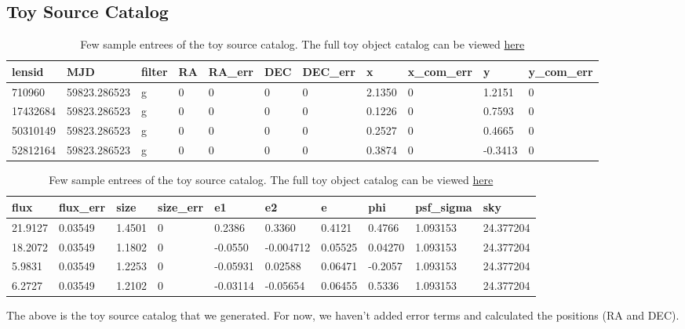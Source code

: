 \documentclass[\docopts]{\docclass}
\begin{document}
\subsection{Toy Source Catalog}
\label{subsec:toysource}

\begin{table}[!h]
\centering
\begin{tabular}{|l|l|l|l|l|l|l|l|l|l|l|}
\hline
lensid   & MJD          & filter & RA & RA\_err & DEC & DEC\_err & x              & x\_com\_err & y               & y\_com\_err \\ \hline 
710960   & 59823.286523 & g      & 0  & 0       & 0   & 0        & 2.1350  & 0           & 1.2151 & 0			\\
17432684 & 59823.286523 & g      & 0  & 0       & 0   & 0        & 0.1226 & 0           & 0.7593  & 0           \\
50310149 & 59823.286523 & g      & 0  & 0       & 0   & 0        & 0.2527 & 0           & 0.4665  & 0           \\
52812164 & 59823.286523 & g      & 0  & 0       & 0   & 0        & 0.3874 & 0           & -0.3413 & 0          \\ \hline
\end{tabular}
\begin{tabular}{|l|l|l|l|l|l|l|l|l|l|}
\hline
flux          & flux\_err       & size          & size\_err & e1               & e2                & e               & phi             & psf\_sigma & sky       \\ \hline
21.9127 & 0.03549 & 1.4501 & 0         & 0.2386    & 0.3360    & 0.4121  & 0.4766  & 1.093153   & 24.377204 \\
18.2072 & 0.03549& 1.1802  & 0         & -0.0550 & -0.004712  & 0.05525 & 0.04270 & 1.093153   & 24.377204 \\
5.9831 & 0.03549 & 1.2253 & 0         & -0.05931 & 0.02588     & 0.06471 & -0.2057 & 1.093153   & 24.377204 \\
6.2727 & 0.03549 & 1.2102  & 0         & -0.03114 & -0.05654  & 0.06455 & 0.5336  & 1.093153   & 24.377204 \\ \hline
\end{tabular}
\caption{Few sample entrees of the toy source catalog. The full toy object catalog can be viewed \href{https://www.dropbox.com/s/muqui8eu3kxox2l/toy_source_catalog.csv?dl=0}{here}}
\label{table:source_table}
\end{table}

The above is the toy source catalog that we generated. For now, we haven't added error terms and calculated the positions (RA and DEC).
\end{document}
